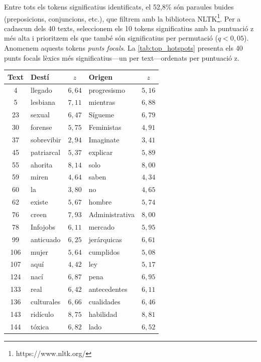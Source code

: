 Entre tots els tokens significatius identificats, el 52,8\% són paraules buides (preposicions, conjuncions, etc.), que filtrem amb la biblioteca NLTK\footnote{https://www.nltk.org/}.
Per a cadascun dels 40 texts, seleccionem els 10 tokens significatius amb la puntuació z més alta i prioritzem els que també són significatius per permutació ($q < 0,05$).
Anomenem aquests tokens \textit{punts focals}. 
La \autoref{tab:top_hotspots} presenta els 40 punts focals lèxics més significatius---un per text---ordenats per puntuació z.
\iftables
\begin{table}[htbp]
\centering
\begin{tabular}{clclc}
\toprule
\textbf{Text} & \textbf{Destí} & $z$ & \textbf{Origen} & $z$ \\
\midrule
4 & llegado & $6,64$ & progresismo & $5,16$ \\
5 & lesbiana & $7,11$ & mientras & $6,88$ \\
23 & sexual & $6,47$ & Sígueme & $6,79$ \\
30 & forense & $5,75$ & Feministas & $4,91$ \\
37 & sobrevibir & $2,94$ & Imaginate & $3,41$ \\
45 & patriarcal & $5,37$ & explicar & $5,89$ \\
55 & ahorita & $8,14$ & solo & $8,00$ \\
59 & miren & $4,64$ & saben & $4,34$ \\
60 & la & $3,80$ & no & $4,65$ \\
62 & existe & $5,67$ & hombre & $5,74$ \\
76 & creen & $7,93$ & Administrativa & $8,00$ \\
78 & Infojobs & $6,11$ & mercado & $5,95$ \\
99 & anticuado & $6,25$ & jerárquicas & $6,61$ \\
106 & mujer & $5,64$ & cumplidos & $5,08$ \\
107 & aquí & $4,42$ & ley & $5,17$ \\
124 & nací & $6,87$ & pena & $6,95$ \\
133 & real & $6,42$ & antecedentes & $6,11$ \\
136 & culturales & $6,66$ & cualidades & $6,46$ \\
143 & ridículo & $8,75$ & habilidad & $8,81$ \\
144 & tóxica & $6,82$ & lado & $6,52$ \\

\end{tabular}
\end{table}

